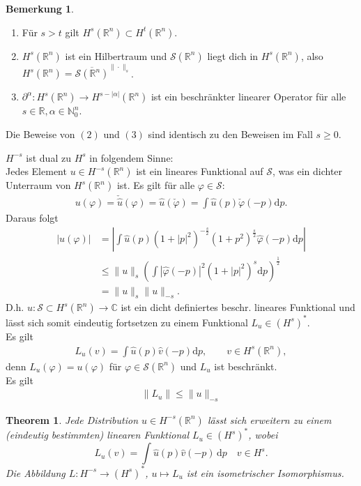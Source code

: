 \documentclass[
paper=a4,
bibtotocnumbered,
liststotocnumbered,
tablecaptionabove,
pointlessnumbers,
twoside,
openright,
10pt
]
{report}
\let\phi\varphi
\newtheorem{thm}{Theorem}[chapter]
\theoremstyle{definition}
\newtheorem*{rem}{Bemerkung}
\numberwithin{equation}{chapter}
\begin{document}
\begin{rem}
\ \\
\begin{enumerate}
\item Für $s>t$ gilt $H^s(\mathbb{R}^n) \subset 
H^t(\mathbb{R}^n).$
\item $H^s(\mathbb{R}^n)$ ist ein Hilbertraum und $\mathcal{S}(\mathbb{R}^n)$ liegt dich in $H^s(\mathbb{R}^n)$, also $H^s(\mathbb{R}^n)= \overline{\mathcal{S}(\mathbb{R}^n)}^{\| \cdot\|_s}$.
\item $\partial^\alpha : H^s(\mathbb{R}^n) \rightarrow H^{s- |\alpha|}(\mathbb{R}^n)$ ist ein beschränkter linearer Operator für alle $s \in \mathbb{R}, \alpha \in \mathbb{N}_0^n$.
\end{enumerate}
Die Beweise von $(2)$ und $(3)$ sind identisch zu den Beweisen im Fall $s \geq 0$.
\end{rem}
$H^{-s}$ ist dual zu $H^s$ in folgendem Sinne:
\\
Jedes Element $u \in H^{-s}(\mathbb{R}^n)$ ist ein lineares Funktional auf $\mathcal{S}$, was ein dichter Unterraum von $H^s(\mathbb{R}^n)$ ist. Es gilt für alle $\phi \in \mathcal{S}:$
\begin{align*}
u(\phi) = \check{\hat{u}}(\phi) = \hat{u}(\check{\phi}) = \int \hat{u}(p) \check{\phi}(-p)\mathrm{d}p.
\end{align*}
Daraus folgt
\begin{align*}
|u(\phi)| &= \left| \int \hat{u}(p)(1+|p|^2)^{-\frac{s}{2}}(1+p^2)^{\frac{s}{2}} \hat{\phi}(-p)\mathrm{d}p \right|
\\ & \leq \|u\|_s \left( \int |\hat{\phi}(-p)|^2 (1+|p|^2)^s\mathrm{d}p\right)^{\frac{1}{2}} 
\\ &=  \|u\|_s \|u\|_{-s}.
\end{align*}
D.h. $u: \mathcal{S} \subset H^s(\mathbb{R}^n)\rightarrow \mathbb{C}$ ist ein dicht definiertes beschr. lineares Funktional und lässt sich somit eindeutig fortsetzen zu einem Funktional $L_u \in \left(H^s\right)^{\ast}$.
\\ Es gilt
\begin{align*}
L_u(v) = \int \hat{u}(p) \hat{v}(-p)\mathrm{d}p, \qquad v \in H^s(\mathbb{R}^n),
\end{align*}
denn $L_u(\phi) = u(\phi)$ für $\phi \in \mathcal{S}(\mathbb{R}^n)$ und $L_u$ ist beschränkt.
\\ Es gilt \begin{align*}
\| L_u \| \leq \|u\|_{-s}
\end{align*}
\begin{thm}\label{6.6}
Jede Distribution $u\in H^{-s}(\mathbb R^n)$ lässt sich erweitern zu einem (eindeutig bestimmten) linearen Funktional $L_u \in (H^s)^*$, wobei 
\begin{equation}
L_u(v) = \int \hat u(p) \hat v(-p)\, \mathrm dp \quad v\in H^s.
\end{equation}
Die Abbildung $L: H^{-s}\to (H^s)^*$, $u\mapsto L_u$ ist ein isometrischer Isomorphismus. 
\end{thm}
\end{document}
